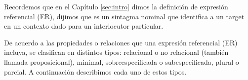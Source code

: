 Recordemos que en el Cap\'itulo \ref{sec:intro} dimos la definici\'on de expresi\'on referencial (ER), dijimos que es un sintagma nominal que identifica a un target en un contexto dado para un interlocutor particular.

De acuerdo a las propiedades o relaciones que una expresi\'on referencial (ER) incluya, se clasifican en distintos tipos: relacional o no relacional (tambi\'en llamada proposicional), minimal, sobreespecificada o subespecificada, plural o parcial. A continuaci\'on describimos cada uno de estos tipos.
